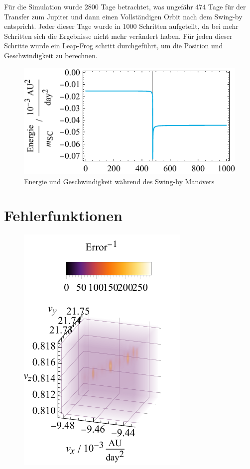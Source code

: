 Für die Simulation wurde 2800 Tage betrachtet, was ungefähr 474 Tage für der Transfer zum Jupiter und dann einen Vollständigen Orbit nach dem Swing-by entspricht.
Jeder dieser Tage wurde in 1000 Schritten aufgeteilt, da bei mehr Schritten sich die Ergebnisse nicht mehr verändert haben.
Für jeden dieser Schritte wurde ein Leap-Frog schritt durchgeführt, um die Position und Geschwindigkeit zu berechnen.


\begin{figure}[h!]
	\centering
	\includegraphics{img/energy.pdf}
	\caption{Energie und Geschwindigkeit während des Swing-by Manövers}
\end{figure}


\section{Fehlerfunktionen}
\begin{figure}[h!]
	\centering
	\includegraphics{img/gridSearch.pdf}
\end{figure}


